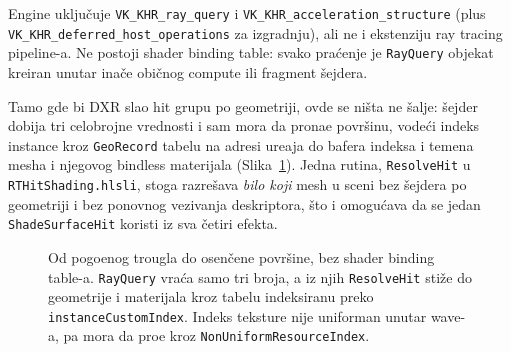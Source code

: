 Engine uklju\v{c}uje \texttt{VK_KHR_ray_query} i \texttt{VK_KHR_acceleration_structure} (plus \texttt{VK_KHR_deferred_host_operations} za izgradnju), ali ne i ekstenziju ray tracing pipeline-a. Ne postoji shader binding table: svako pra\'cenje je \texttt{RayQuery} objekat kreiran unutar ina\v{c}e obi\v{c}nog compute ili fragment \v{s}ejdera.

Tamo gde bi DXR slao hit grupu po geometriji, ovde se ni\v{s}ta ne \v{s}alje: \v{s}ejder dobija tri celobrojne vrednosti i sam mora da prona\dj{}e povr\v{s}inu, vode\'ci indeks instance kroz \texttt{GeoRecord} tabelu na adresi ure\dj{}aja do bafera indeksa i temena mesha i njegovog bindless materijala (Slika~\ref{fig:hitresolve}). Jedna rutina, \texttt{ResolveHit} u \texttt{RTHitShading.hlsli}, stoga razre\v{s}ava \emph{bilo koji} mesh u sceni bez \v{s}ejdera po geometriji i bez ponovnog vezivanja deskriptora, \v{s}to i omogu\'cava da se jedan \texttt{ShadeSurfaceHit} koristi iz sva \v{c}etiri efekta.

\begin{figure}[tbp]
\centering
{}
\caption[Razre\v{s}avanje pogotka kroz bindless tabelu geometrije]{Od pogo\dj{}enog trougla do osen\v{c}ene povr\v{s}ine, bez shader binding table-a. \texttt{RayQuery} vra\'ca samo tri broja, a iz njih \texttt{ResolveHit} sti\v{z}e do geometrije i materijala kroz tabelu indeksiranu preko \texttt{instanceCustomIndex}. Indeks teksture nije uniforman unutar wave-a, pa mora da pro\dj{}e kroz \texttt{NonUniformResourceIndex}.}
\label{fig:hitresolve}
\end{figure}

